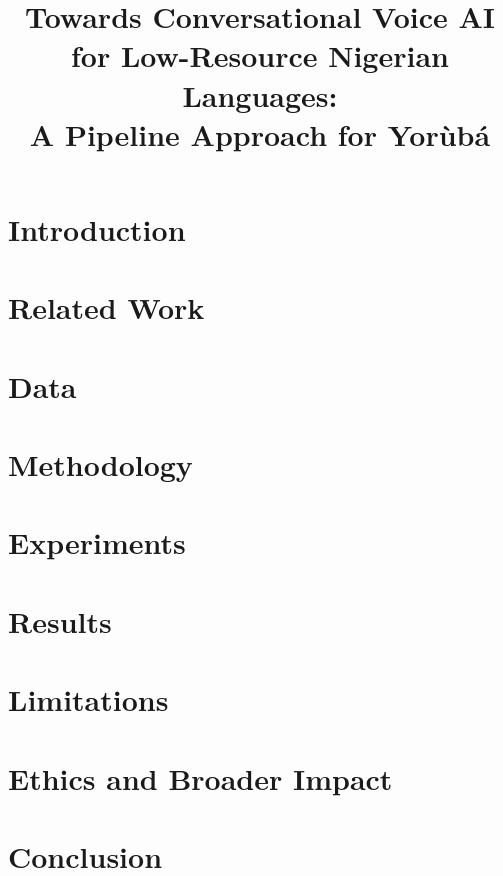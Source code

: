 \documentclass[11pt]{article}
\title{Towards Conversational Voice AI for Low-Resource Nigerian Languages:\\
A Pipeline Approach for Yor\`ub\'a}
\author{
}
\date{}
\begin{document}
\maketitle

\begin{abstract}

\end{abstract}

\section{Introduction}
\label{sec:introduction}


\section{Related Work}
\label{sec:related}


\section{Data}
\label{sec:data}


\section{Methodology}
\label{sec:methodology}


\section{Experiments}
\label{sec:experiments}


\section{Results}
\label{sec:results}


\section{Limitations}
\label{sec:limitations}


\section{Ethics and Broader Impact}
\label{sec:ethics}


\section{Conclusion}




\end{document}
